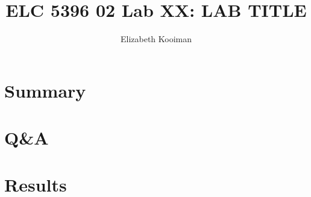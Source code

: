 \documentclass[11pt]{article}
\begin{document}
\title{ELC 5396 02 Lab XX: LAB TITLE}
\author{Elizabeth Kooiman}

\maketitle


\section*{Summary}



\section*{Q\&A}


\section*{Results}






%		
\end{document}
